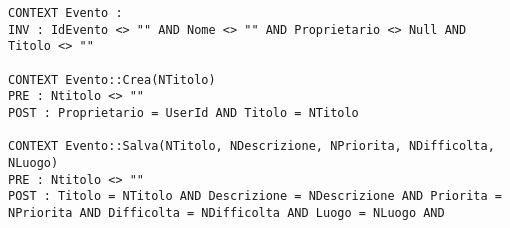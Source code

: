 \begin{listaPersonale}[OCL]{}
    \begin{lstlisting}
CONTEXT Evento :
INV : IdEvento <> "" AND Nome <> "" AND Proprietario <> Null AND Titolo <> ""

CONTEXT Evento::Crea(NTitolo)
PRE : Ntitolo <> ""
POST : Proprietario = UserId AND Titolo = NTitolo

CONTEXT Evento::Salva(NTitolo, NDescrizione, NPriorita, NDifficolta, NLuogo)
PRE : Ntitolo <> ""
POST : Titolo = NTitolo AND Descrizione = NDescrizione AND Priorita = NPriorita AND Difficolta = NDifficolta AND Luogo = NLuogo AND 
    \end{lstlisting}







\end{listaPersonale}
